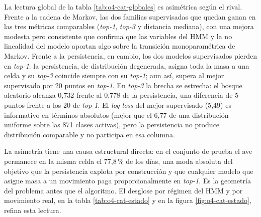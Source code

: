 La lectura global de la tabla \ref{tab:o4-cat-globales} es asimétrica según el rival.
Frente a la cadena de Markov, las dos familias supervisadas que quedan ganan en las
tres métricas comparables (\textit{top-1}, \textit{top-3} y distancia mediana), con
una mejora modesta pero consistente que confirma que las variables del HMM y la no
linealidad del modelo aportan algo sobre la transición monoparamétrica de Markov.
Frente a la persistencia, en cambio, los dos modelos supervisados pierden en
\textit{top-1}: la persistencia, de distribución degenerada, asigna toda la masa
a una celda y su \textit{top-3} coincide siempre con su \textit{top-1}; aun así,
supera al mejor supervisado por 20 puntos en \textit{top-1}. En \textit{top-3} la
brecha se estrecha: el bosque aleatorio alcanza 0,732 frente al 0,778 de la
persistencia, una diferencia de 5 puntos frente a los 20 de \textit{top-1}.
El \textit{log-loss} del mejor supervisado (5,49) es
informativo en términos absolutos (mejor que el 6,77 de una distribución uniforme
sobre las 871 clases activas), pero la persistencia no produce distribución
comparable y no participa en esa columna.

La asimetría tiene una causa estructural directa: en el conjunto de prueba el ave
permanece en la misma celda el 77,8\,\% de los días, una moda absoluta del objetivo
que la persistencia explota por construcción y que cualquier modelo que asigne masa a
un movimiento paga proporcionalmente en \textit{top-1}. Es la geometría del problema
antes que el algoritmo. El desglose por régimen del HMM y por movimiento real, en la
tabla \ref{tab:o4-cat-estado} y en la figura \ref{fig:o4-cat-estado}, refina esta
lectura.

